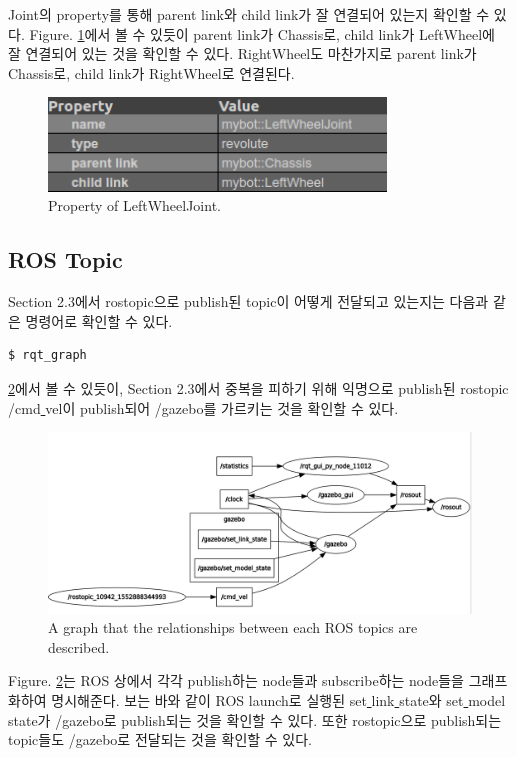 \documentclass{article}
\begin{document}
Joint의 property를 통해 parent link와 child link가 잘 연결되어 있는지 확인할 수 있다. Figure. \ref{fig:joint}에서 볼 수 있듯이 parent link가 Chassis로, child link가 LeftWheel에 잘 연결되어 있는 것을 확인할 수 있다. RightWheel도 마찬가지로 parent link가 Chassis로, child link가 RightWheel로 연결된다.

\begin{figure}[h]
	\centering
	\includegraphics[height=2.5cm]{materials/joint_constraint}
	\caption{Property of LeftWheelJoint.}
	\label{fig:joint} 	
\end{figure}

\subsection{ROS Topic}

Section 2.3에서 rostopic으로 publish된 topic이 어떻게 전달되고 있는지는 다음과 같은 명령어로 확인할 수 있다.

\begin{lstlisting}[frame=single]
$ rqt_graph
\end{lstlisting}

\ref{fig:rqt_graph}에서 볼 수 있듯이, Section 2.3에서 중복을 피하기 위해 익명으로 publish된 rostopic /cmd\underline{ }vel이 publish되어 /gazebo를 가르키는 것을 확인할 수 있다.

\begin{figure}[h]
	\centering
	\includegraphics[width=0.9\linewidth]{materials/rqt_graph}
	\caption{A graph that the relationships between each ROS topics are described.}
	\label{fig:rqt_graph} 	
\end{figure}

Figure. \ref{fig:rqt_graph}는 ROS 상에서 각각 publish하는 node들과 subscribe하는 node들을 그래프화하여 명시해준다. 보는 바와 같이 ROS launch로 실행된 set\underline{ }link\underline{ }state와 set\underline{ }model\underline{ }state가 /gazebo로 publish되는 것을 확인할 수 있다. 또한 rostopic으로 publish되는 topic들도 /gazebo로 전달되는 것을 확인할 수 있다.
\end{document}
